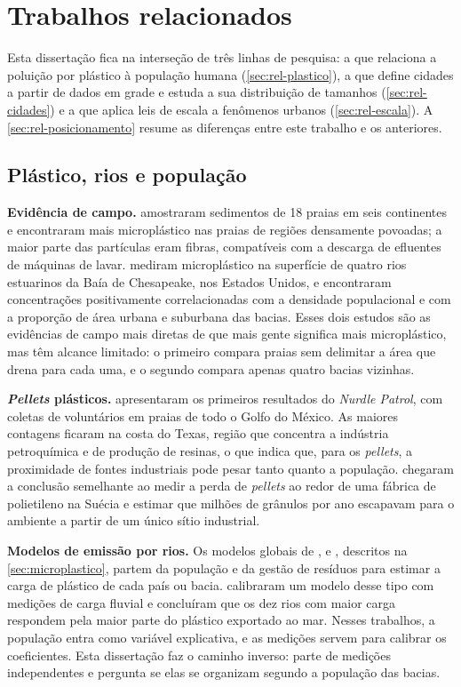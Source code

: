 \chapter{Trabalhos relacionados}
\label{chap:trabalhos-relacionados}

Esta dissertação fica na interseção de três linhas de pesquisa: a que relaciona a poluição por plástico à população humana (\autoref{sec:rel-plastico}), a que define cidades a partir de dados em grade e estuda a sua distribuição de tamanhos (\autoref{sec:rel-cidades}) e a que aplica leis de escala a fenômenos urbanos (\autoref{sec:rel-escala}). A \autoref{sec:rel-posicionamento} resume as diferenças entre este trabalho e os anteriores.

\section{Plástico, rios e população}
\label{sec:rel-plastico}

\textbf{Evidência de campo.}  amostraram sedimentos de 18 praias em seis continentes e encontraram mais microplástico nas praias de regiões densamente povoadas; a maior parte das partículas eram fibras, compatíveis com a descarga de efluentes de máquinas de lavar.  mediram microplástico na superfície de quatro rios estuarinos da Baía de Chesapeake, nos Estados Unidos, e encontraram concentrações positivamente correlacionadas com a densidade populacional e com a proporção de área urbana e suburbana das bacias. Esses dois estudos são as evidências de campo mais diretas de que mais gente significa mais microplástico, mas têm alcance limitado: o primeiro compara praias sem delimitar a área que drena para cada uma, e o segundo compara apenas quatro bacias vizinhas.

\textbf{\textit{Pellets} plásticos.}  apresentaram os primeiros resultados do \textit{Nurdle Patrol}, com coletas de voluntários em praias de todo o Golfo do México. As maiores contagens ficaram na costa do Texas, região que concentra a indústria petroquímica e de produção de resinas, o que indica que, para os \textit{pellets}, a proximidade de fontes industriais pode pesar tanto quanto a população.  chegaram a conclusão semelhante ao medir a perda de \textit{pellets} ao redor de uma fábrica de polietileno na Suécia e estimar que milhões de grânulos por ano escapavam para o ambiente a partir de um único sítio industrial.

\textbf{Modelos de emissão por rios.} Os modelos globais de ,  e , descritos na \autoref{sec:microplastico}, partem da população e da gestão de resíduos para estimar a carga de plástico de cada país ou bacia.  calibraram um modelo desse tipo com medições de carga fluvial e concluíram que os dez rios com maior carga respondem pela maior parte do plástico exportado ao mar. Nesses trabalhos, a população entra como variável explicativa, e as medições servem para calibrar os coeficientes. Esta dissertação faz o caminho inverso: parte de medições independentes e pergunta se elas se organizam segundo a população das bacias.

